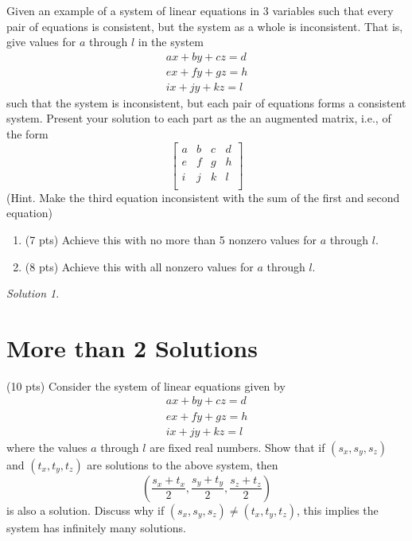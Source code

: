 \documentclass{article}
\theoremstyle{remark}
\newtheorem*{solution}{Solution}
\begin{document}
Given an example of a system of linear equations in 3 variables such that every pair of equations is consistent, but the system as a whole is inconsistent. That is, give values for $a$ through $l$ in the system
\begin{align*}
  ax + by + cz = d \\
  ex + fy + gz = h \\
  ix + jy + kz = l
\end{align*}
such that the system is inconsistent, but each pair of equations forms a consistent system. Present your solution to each part as the an augmented matrix, i.e., of the form
\begin{displaymath}
  \begin{bmatrix}
    a & b & c & d \\
    e & f & g & h \\
    i & j & k & l \\
  \end{bmatrix}
\end{displaymath}
(Hint. Make the third equation inconsistent with the sum of the first and second equation)
\begin{enumerate}
\item (7 pts) Achieve this with no more than 5 nonzero values for $a$ through $l$.
\item (8 pts) Achieve this with all nonzero values for $a$ through $l$.
\end{enumerate}

\begin{solution}
\end{solution}

\pagebreak
\section{More than 2 Solutions}

(10 pts) Consider the system of linear equations given by
\begin{align*}
  ax + by + cz = d \\
  ex + fy + gz = h \\
  ix + jy + kz = l
\end{align*}
where the values $a$ through $l$ are fixed real numbers.
Show that if $(s_x, s_y, s_z)$ and $(t_x, t_y, t_z)$ are solutions to the above system, then
\begin{displaymath}
  \left(\frac{s_x + t_x}{2}, \frac{s_y + t_y}{2}, \frac{s_z + t_z}{2} \right)
\end{displaymath}
is also a solution.
Discuss why if $(s_x, s_y, s_z) \not = (t_x, t_y, t_z)$, this implies the system has infinitely many solutions.
\end{document}
